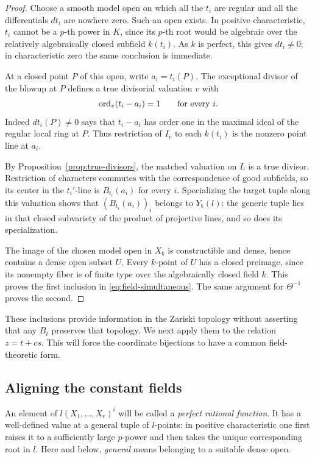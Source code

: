 \begin{proof}
Choose a smooth model open on which all the \(t_i\) are regular and all the
differentials \(dt_i\) are nowhere zero.  Such an open exists.  In positive
characteristic, \(t_i\) cannot be a \(p\)-th power in \(K\), since its
\(p\)-th root would be algebraic over the relatively algebraically closed
subfield \(k(t_i)\).  As \(k\) is perfect, this gives \(dt_i\ne0\); in
characteristic zero the same conclusion is immediate.

At a closed point \(P\) of this open, write \(a_i=t_i(P)\).  The exceptional
divisor of the blowup at \(P\) defines a true divisorial valuation \(v\) with
\[
 \operatorname{ord}_v(t_i-a_i)=1\qquad\text{for every }i.
\]
Indeed \(dt_i(P)\ne0\) says that \(t_i-a_i\) has order one in the maximal
ideal of the regular local ring at \(P\).  Thus restriction of \(I_v\)
to each \(k(t_i)\) is the nonzero point line at \(a_i\).

By Proposition~\ref{prop:true-divisors}, the matched valuation on \(L\) is a
true divisor.  Restriction of characters commutes with the correspondence
of good subfields, so its center in the \(t_i'\)-line is \(B_{t_i}(a_i)\)
for every \(i\).  Specializing the target tuple along this valuation shows
that \((B_{t_i}(a_i))_i\) belongs to \(Y_{\mathbf t}(l)\): the generic tuple
lies in that closed subvariety of the product of projective lines, and so
does its specialization.

The image of the chosen model open in \(X_{\mathbf t}\) is constructible
and dense, hence contains a dense open subset \(U\).  Every \(k\)-point of
\(U\) has a closed preimage, since its nonempty fiber is of finite type
over the algebraically closed field \(k\).  This proves the first inclusion
in \eqref{eq:field-simultaneous}.  The same argument for \(\Theta^{-1}\)
proves the second.
\end{proof}

These inclusions provide information in the Zariski topology without
asserting that any \(B_t\) preserves that topology.  We next apply them to
the relation \(z=t+cs\).  This will force the coordinate bijections to have
a common field-theoretic form.

\subsection{Aligning the constant fields}

An element of \(l(X_1,\ldots,X_r)^i\) will be called a \emph{perfect rational
function}.  It has a well-defined value at a general tuple of \(l\)-points:
in positive characteristic one first raises it to a sufficiently large
\(p\)-power and then takes the unique corresponding root in \(l\).
Here and below, \emph{general} means belonging to a suitable dense open.

